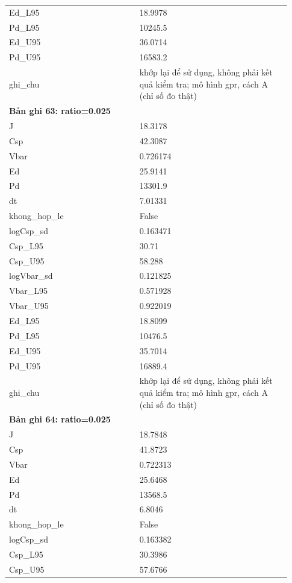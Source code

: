 \begin{longtable}{p{0.43\linewidth}p{0.50\linewidth}}
Ed\_\allowbreak L95 & 18.9978 \\
Pd\_\allowbreak L95 & 10245.5 \\
Ed\_\allowbreak U95 & 36.0714 \\
Pd\_\allowbreak U95 & 16583.2 \\
ghi\_\allowbreak chu & khớp lại để sử dụng, không phải kết quả kiểm tra; mô hình gpr, cách A (chỉ số đo thật) \\
\midrule
\multicolumn{2}{p{0.95\linewidth}}{\textbf{Bản ghi 63: ratio=0.025}} \\
J & 18.3178 \\
Csp & 42.3087 \\
Vbar & 0.726174 \\
Ed & 25.9141 \\
Pd & 13301.9 \\
dt & 7.01331 \\
khong\_\allowbreak hop\_\allowbreak le & False \\
logCsp\_\allowbreak sd & 0.163471 \\
Csp\_\allowbreak L95 & 30.71 \\
Csp\_\allowbreak U95 & 58.288 \\
logVbar\_\allowbreak sd & 0.121825 \\
Vbar\_\allowbreak L95 & 0.571928 \\
Vbar\_\allowbreak U95 & 0.922019 \\
Ed\_\allowbreak L95 & 18.8099 \\
Pd\_\allowbreak L95 & 10476.5 \\
Ed\_\allowbreak U95 & 35.7014 \\
Pd\_\allowbreak U95 & 16889.4 \\
ghi\_\allowbreak chu & khớp lại để sử dụng, không phải kết quả kiểm tra; mô hình gpr, cách A (chỉ số đo thật) \\
\midrule
\multicolumn{2}{p{0.95\linewidth}}{\textbf{Bản ghi 64: ratio=0.025}} \\
J & 18.7848 \\
Csp & 41.8723 \\
Vbar & 0.722313 \\
Ed & 25.6468 \\
Pd & 13568.5 \\
dt & 6.8046 \\
khong\_\allowbreak hop\_\allowbreak le & False \\
logCsp\_\allowbreak sd & 0.163382 \\
Csp\_\allowbreak L95 & 30.3986 \\
Csp\_\allowbreak U95 & 57.6766 \\

\end{longtable}
